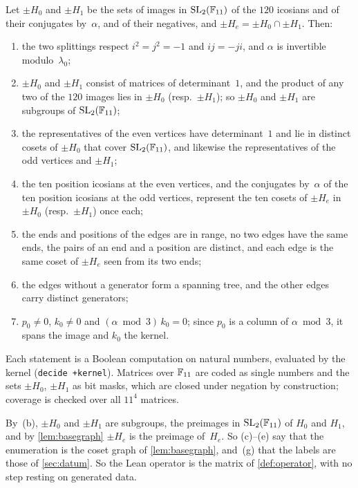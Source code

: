 \begin{lemma}\label{lem:enumeration}
Let $\pm H_0$ and $\pm H_1$ be the sets of images in $\operatorname{SL}_2(\mathbb{F}_{11})$ of the $120$ icosians and of their conjugates
by~$\alpha$, and of their negatives, and $\pm H_e=\pm H_0\cap\pm H_1$. Then:
\begin{enumerate}[label=(\alph*)]
\item the two splittings respect $i^2=j^2=-1$ and $ij=-ji$, and $\alpha$ is invertible modulo~$\lambda_0$;
\item $\pm H_0$ and $\pm H_1$ consist of matrices of determinant~$1$, and the product of any two of the $120$ images lies
in $\pm H_0$ (resp.\ $\pm H_1$); so $\pm H_0$ and $\pm H_1$ are subgroups of $\operatorname{SL}_2(\mathbb{F}_{11})$;
\item the representatives of the even vertices have determinant~$1$ and lie in distinct cosets of $\pm H_0$ that cover
$\operatorname{SL}_2(\mathbb{F}_{11})$, and likewise the representatives of the odd vertices and $\pm H_1$;
\item the ten position icosians at the even vertices, and the conjugates by~$\alpha$ of the ten position icosians at the
odd vertices, represent the ten cosets of $\pm H_e$ in $\pm H_0$ (resp.\ $\pm H_1$) once each;
\item the ends and positions of the edges are in range, no two edges have the same ends, the pairs of an end and a
position are distinct, and each edge is the same coset of $\pm H_e$ seen from its two ends;
\item the edges without a generator form a spanning tree, and the other edges carry distinct generators;
\item $p_0\ne0$, $k_0\ne0$ and $(\alpha\bmod3)\,k_0=0$; since $p_0$ is a column of $\alpha\bmod3$, it spans the image
and $k_0$ the kernel.
\end{enumerate}
\end{lemma}
\begin{outline}
Each statement is a Boolean computation on natural numbers, evaluated by the kernel (\texttt{decide +kernel}). Matrices
over $\mathbb{F}_{11}$ are coded as single numbers and the sets $\pm H_0$, $\pm H_1$ as bit masks, which are closed under negation
by construction; coverage is checked over all $11^4$ matrices.
\end{outline}

By~(b), $\pm H_0$ and $\pm H_1$ are subgroups, the preimages in $\operatorname{SL}_2(\mathbb{F}_{11})$ of $H_0$ and $H_1$, and by
\cref{lem:basegraph} $\pm H_e$ is the preimage of~$H_e$. So (c)--(e) say that the enumeration is the coset graph of
\cref{lem:basegraph}, and~(g) that the labels are those of \cref{sec:datum}. So the Lean operator  is
the matrix of \cref{def:operator}, with no step resting on generated data.

